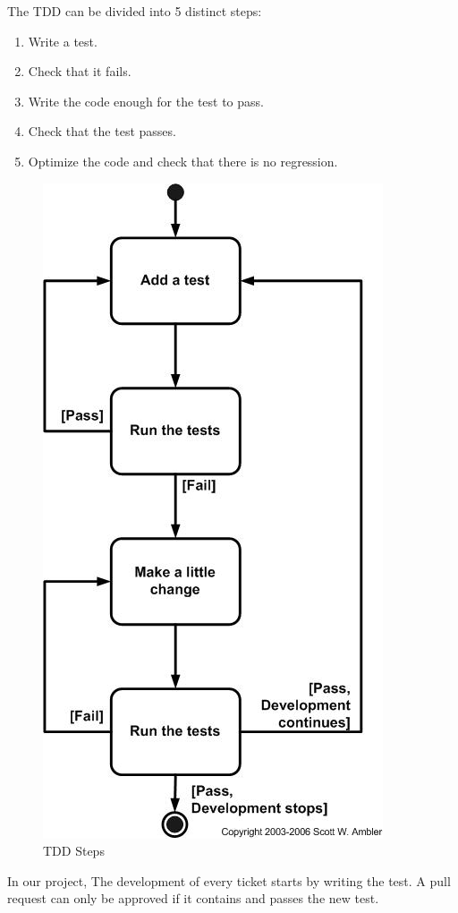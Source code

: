 \begin{spacing}{1.2}
The TDD can be divided into 5 distinct steps:
\begin{enumerate}
	\item  Write a test.
	\item Check that it fails.
	\item Write the code enough for the test to pass.
	\item Check that the test passes.
	\item Optimize the code and check that there is no regression.
\end{enumerate}

\begin{figure}[!ht]\centering
\includegraphics[scale=0.6]{tddSteps.jpg}
\caption{TDD Steps}
\label{fig:fig1}
\end{figure}
\newpage
In our project, The development of every ticket starts by writing the test. A pull request can only be approved if it contains and passes the new test.


\end{spacing}
